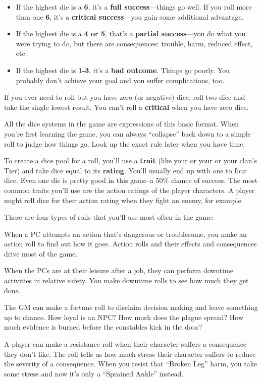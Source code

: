 \begin{itemize}
\item If the highest die is a \textbf{6}, it’s a \textbf{full success}—things go well. If you roll more than one \textbf{6}, it’s a \textbf{critical success}—you gain some additional advantage.
\item If the highest die is a \textbf{4 or 5}, that’s a \textbf{partial success}—you do what you were trying to do, but there are consequences: trouble, harm, reduced effect, etc.
\item If the highest die is \textbf{1-3}, it’s a \textbf{bad outcome}. Things go poorly. You probably don’t achieve your goal and you suffer complications, too.
\end{itemize}

\begin{qb}
If you ever need to roll but you have zero (or negative) dice, roll two dice and take the single lowest result. You can’t roll a \textbf{critical} when you have zero dice.
\end{qb}

All the dice systems in the game are expressions of this basic format. When you’re first learning the game, you can always ``collapse'' back down to a simple roll to judge how things go. Look up the exact rule later when you have time.

To create a dice pool for a roll, you’ll use a \textbf{trait} (like your  or your  or your clan’s Tier) and take dice equal to its \textbf{rating}. You’ll usually end up with one to four dice. Even one die is pretty good in this game--a 50\% chance of success. The most common traits you’ll use are the action ratings of the player characters. A player might roll dice for their  action rating when they fight an enemy, for example.

There are four types of rolls that you’ll use most often in the game:

\begin{description}[font=\rmfamily\bfseries\scshape, leftmargin=1cm]
\item[Action roll] When a PC attempts an action that’s dangerous or troublesome, you make an action roll to find out how it goes. Action rolls and their effects and consequences drive most of the game.
\item[Downtime roll] When the PCs are at their leisure after a job, they can perform downtime activities in relative safety. You make downtime rolls to see how much they get done.
\item[Fortune roll] The GM can make a fortune roll to disclaim decision making and leave something up to chance. How loyal is an NPC? How much does the plague spread? How much evidence is burned before the constables kick in the door?
\item[Resistance roll] A player can make a resistance roll when their character suffers a consequence they don’t like. The roll tells us how much stress their character suffers to reduce the severity of a consequence. When you resist that ``Broken Leg'' harm, you take some stress and now it’s only a ``Sprained Ankle'' instead.
\end{description}

